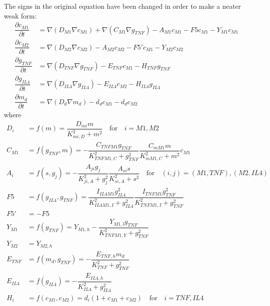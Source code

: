 \documentclass[a4]{article}
\begin{document}
The signs in the original equation have been changed in order to make a neater weak form:
%
\begin{subequations}
\begin{align}
		\dfrac{\partial c_{M1}}{\partial t} &= \nabla \left( D_{M1} \nabla c_{M1} \right) + \nabla \left( C_{M1} \nabla g_{TNF} \right) - A_{M1} c_{M1} - F5 c_{M1} - Y_{M1} c_{M1} \\
		\dfrac{\partial c_{M2}}{\partial t} &= \nabla \left( D_{M2} \nabla c_{M2} \right) - A_{M2} c_{M2} - F5' c_{M1} - Y_{M2} c_{M2} \\
		\dfrac{\partial g_{TNF}}{\partial t} &= \nabla \left( D_{TNF} \nabla g_{TNF} \right) - E_{TNF} c_{M1} - H_{TNF} g_{TNF} \\
		\dfrac{\partial g_{IL4}}{\partial t} &= \nabla \left( D_{IL4} \nabla g_{IL4} \right) - E_{IL4} c_{M2} - H_{IL4} g_{IL4} \\
		\dfrac{\partial m_{d}}{\partial t} &= \nabla \left( D_{d} \nabla m_{d} \right) - d_d c_{M1} - d_d c_{M2}
\end{align}
\end{subequations}
%
where
%
\begin{subequations}
\begin{align}
		D_i &= f \left( m \right) = \dfrac{D_{mi} m}{K_{mi,D}^2 + m^2} \quad \text{for} \quad i=M1,M2 \\
		C_{M1} &= f \left( g_{TNF}, m \right) = - \dfrac{C_{TNFM1} g_{TNF}}{K_{TNFM1,C}^2 + g_{TNF}^2} \dfrac{C_{mM1} m}{K_{mM1,C}^2 + m^2} c_{M1} \\
		A_i &= f \left( s, g_j \right) = - \dfrac{A_{ji} g_j}{K_{ji,A}^2 + g_j^2} \dfrac{A_{si} s}{K_{si,A}^2 + s^2} \quad \text{for} \quad (i,j)=(M1,TNF),(M2,IL4) \\
		F5 &= f \left( g_{IL4}, g_{TNF} \right) = \dfrac{I_{IL4M1} g_{IL4}^2}{K_{IL4M1,I}^2 + g_{IL4}^2} \dfrac{I_{TNFM1} g_{TNF}^2}{K_{TNFM1,I}^2 + g_{TNF}^2} \\
		F5' &= -F5 \\
		Y_{M1} &= f \left( g_{TNF} \right) = Y_{M1,h} - \dfrac{Y_{M1,l} g_{TNF}}{K_{TNFM1,Y}^2 + g_{TNF}^2} \\
		Y_{M2} &= Y_{M2,h} \\
		E_{TNF} &= f \left( m_d, g_{TNF} \right) = - \dfrac{E_{TNF,h} m_d}{K_{TNF}^2 + g_{TNF}^2} \\
		E_{IL4} &= f \left( g_{IL4} \right) = - \dfrac{E_{IL4,h}}{K_{IL4}^2 + g_{IL4}^2} \\
		H_{i} &= f \left( c_{M1}, c_{M2} \right) = d_i \left( 1 + c_{M1} + c_{M2} \right) \quad \text{for} \quad i=TNF,IL4
\end{align}
\end{subequations}
\end{document}
